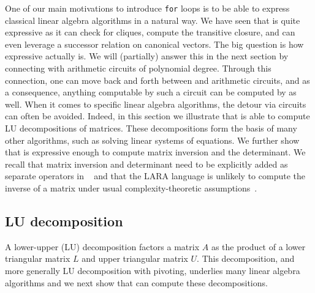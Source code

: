 One of our main motivations to introduce \texttt{for} loops is to be able
to express classical linear algebra algorithms in a natural way. We have seen that \langfor is
quite expressive as it can check for cliques, compute the transitive closure, and can even
leverage a successor relation on canonical vectors. The big question is how expressive \langfor
actually is. We will (partially) answer this in the next section by connecting \langfor with 
arithmetic circuits of polynomial degree. Through this connection, one can move back and forth between \langfor and arithmetic circuits, and as a consequence, anything computable by such a circuit can be
computed by \langfor as well. When it comes to specific linear algebra algorithms, the detour via circuits
can often be avoided. Indeed, in this section we illustrate that \langfor is able to
compute LU decompositions of matrices. These decompositions form the basis of many other algorithms, such as solving linear systems of equations. We further show that \langfor is expressive enough to compute matrix inversion and the determinant. We recall that matrix inversion and determinant need to be explicitly added as separate operators in \lang~\cite{matlang,matlang-journal} and that the LARA language is unlikely to compute the inverse of a matrix under usual complexity-theoretic assumptions~\cite{BarceloH0S20}.

\subsection{LU decomposition}
%
%
A lower-upper (LU) decomposition factors a matrix $A$ as the product of a lower triangular matrix $L$ and upper triangular matrix $U$.  This decomposition, and more generally LU decomposition with pivoting,  underlies many linear algebra algorithms and 
we next show that \langfor can compute these decompositions.

